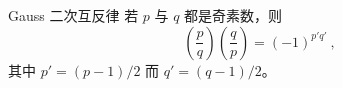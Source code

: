 
\begin{issues}
\issueTODO
{}
\end{issues}

\begin{theorem}{Gauss 二次互反律}
若 $p$ 与 $q$ 都是奇素数，则
\begin{equation}
\left(\frac pq\right)\left(\frac qp\right) = (-1)^{p' q'} ~,
\end{equation}
其中 $p' = (p-1)/2$ 而 $q' = (q-1)/2$。
\end{theorem}
